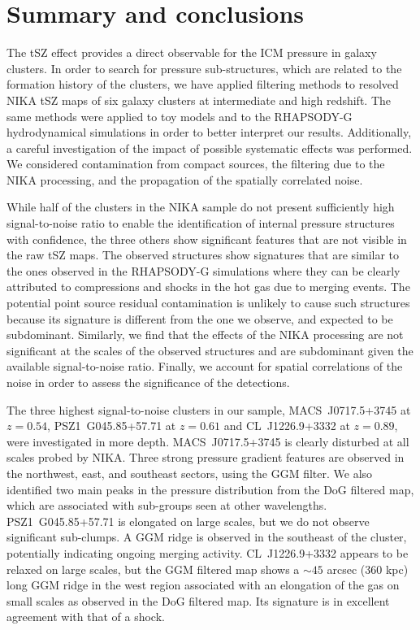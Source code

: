 \documentclass[twocolumn,traditabstract]{aa}
\begin{document}
\section{Summary and conclusions}\label{sec:Summary_and_conclusions}
The tSZ effect provides a direct observable for the ICM pressure in galaxy clusters. In order to search for pressure sub-structures, which are related to the formation history of the clusters, we have applied filtering methods to resolved NIKA tSZ maps of six galaxy clusters at intermediate and high redshift. The same methods were applied to toy models and to the RHAPSODY-G hydrodynamical simulations in order to better interpret our results. Additionally, a careful investigation of the impact of possible systematic effects was performed. We considered contamination from compact sources, the filtering due to the NIKA processing, and the propagation of the spatially correlated noise.

While half of the clusters in the NIKA sample do not present sufficiently high signal-to-noise ratio to enable the identification of internal pressure structures with confidence, the three others show significant features that are not visible in the raw tSZ maps. The observed structures show signatures that are similar to the ones observed in the RHAPSODY-G simulations where they can be clearly attributed to compressions and shocks in the hot gas due to merging events. The potential point source residual contamination is unlikely to cause such structures because its signature is different from the one we observe, and expected to be subdominant. Similarly, we find that the effects of the NIKA processing are not significant at the scales of the observed structures and are subdominant given the available signal-to-noise ratio. Finally, we account for spatial correlations of the noise in order to assess the significance of the detections.

The three highest signal-to-noise clusters in our sample, \mbox{MACS~J0717.5+3745} at $z=0.54$, \mbox{PSZ1~G045.85+57.71} at $z=0.61$ and \mbox{CL~J1226.9+3332} at $z=0.89$, were investigated in more depth. \mbox{MACS~J0717.5+3745} is clearly disturbed at all scales probed by NIKA. Three strong pressure gradient features are observed in the northwest, east, and southeast sectors, using the GGM filter. We also identified two main peaks in the pressure distribution from the DoG filtered map, which are associated with sub-groups seen at other wavelengths. \mbox{PSZ1~G045.85+57.71} is elongated on large scales, but we do not observe significant sub-clumps. A GGM ridge is observed in the southeast of the cluster, potentially indicating ongoing merging activity. \mbox{CL~J1226.9+3332} appears to be relaxed on large scales, but the GGM filtered map shows a $\sim 45$ arcsec (360 kpc) long GGM ridge in the west region associated with an elongation of the gas on small scales as observed in the DoG filtered map. Its signature is in excellent agreement with that of a shock.
\end{document}
